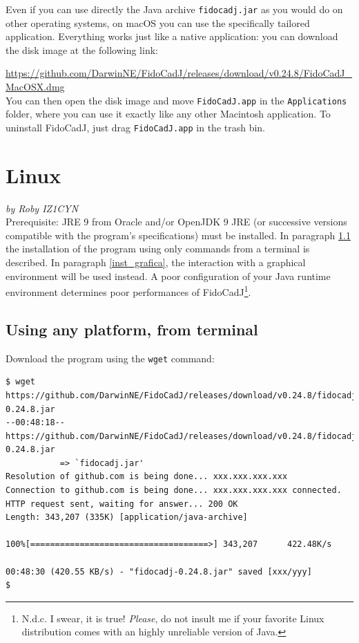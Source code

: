 \documentclass[10pt,a4paper,twoside]{scrreprt}
\begin{document}
Even if you can use directly the Java archive \lstinline!fidocadj.jar! as you would do on other operating systems, on macOS you can use the specifically tailored application. Everything works just like a native application: you can download the disk image at the following link:

{\footnotesize
\href{https://github.com/DarwinNE/FidoCadJ/releases/download/v0.24.8/FidoCadJ_MacOSX.dmg}{https://github.com/DarwinNE/FidoCadJ/releases/download/v0.24.8/FidoCadJ\_MacOSX.dmg}}\\
You can then open the disk image and move \lstinline!FidoCadJ.app! in the \lstinline!Applications! folder, where you can use it exactly like any other Macintosh application. To uninstall FidoCadJ, just drag  \lstinline!FidoCadJ.app! in the trash bin.


\section{Linux}
\label{installazione_linux} \textsl{by Roby IZ1CYN}\\


Prerequisite: JRE 9 from Oracle and/or OpenJDK
9 JRE (or successive versions compatible with the program's
specifications) must be installed. In paragraph \ref{inst_testo}
the installation of the program using only commands from a terminal
is described. In paragraph \ref{inst_grafica}, the interaction
with a graphical environment will be used instead. A poor configuration of your Java runtime environment determines poor performances of FidoCadJ\footnote{N.d.c. I swear, it is true! \textit{Please}, do not insult me if your favorite Linux distribution comes with an highly unreliable version of Java.}.

\subsection{Using any platform, from terminal}

\label{inst_testo} Download the program using the \lstinline!wget! command:



\begin{lstlisting}
$ wget https://github.com/DarwinNE/FidoCadJ/releases/download/v0.24.8/fidocadj-0.24.8.jar
--00:48:18--  https://github.com/DarwinNE/FidoCadJ/releases/download/v0.24.8/fidocadj-0.24.8.jar
           => `fidocadj.jar'
Resolution of github.com is being done... xxx.xxx.xxx.xxx
Connection to github.com is being done... xxx.xxx.xxx.xxx connected.
HTTP request sent, waiting for answer... 200 OK
Length: 343,207 (335K) [application/java-archive]

100%[====================================>] 343,207      422.48K/s

00:48:30 (420.55 KB/s) - "fidocadj-0.24.8.jar" saved [xxx/yyy]
$
\end{lstlisting}
\lstset{
    basicstyle=\small\ttfamily}
\end{document}
